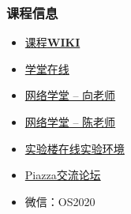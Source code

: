 \documentclass[UTF8]{ctexbeamer}
\begin{document}
\begin{frame}
	\frametitle{课程信息}
	\begin{itemize}
		\item \href{http://os.cs.tsinghua.edu.cn/oscourse/OS2018spring}{课程\textbf{WIKI}}
		\item \href{http://www.xuetangx.com/courses/course-v1:TsinghuaX+30240243X_2015_T2+2015_T2/about}{学堂在线}
		\item \href{http://learn.tsinghua.edu.cn/f/wlxt/index/course/teacher/course?wlkcid=2019-2020-2140259621}{网络学堂 -- 向老师}		
		\item \href{http://learn.tsinghua.edu.cn/f/wlxt/index/course/teacher/course?wlkcid=2019-2020-2140259622}{网络学堂 -- 陈老师}
		\item \href{https://www.shiyanlou.com/courses/221}{实验楼在线实验环境}
		\item \href{https://piazza.com/tsinghua.edu.cn/spring2015/30240243x/home}{Piazza交流论坛}
		\item 微信：OS2020
	\end{itemize}
\end{frame}

\end{document}

